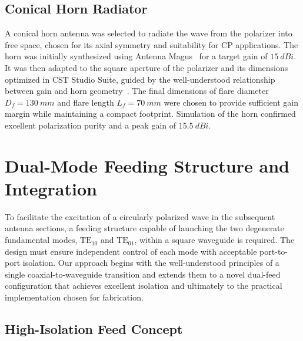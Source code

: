 \documentclass[journal]{IEEEtran}
\newcommand{\TE}[2]{\text{TE}_{#1#2}}
\begin{document}
\subsection{Conical Horn Radiator}
\label{subsec:conical-horn-radiator}

A conical horn antenna was selected to radiate the wave from the polarizer into free space, chosen for its axial symmetry and suitability for CP applications. The horn was initially synthesized using Antenna Magus~\cite{antenna-magus} for a target gain of $\qty{15}{dBi}$. It was then adapted to the square aperture of the polarizer and its dimensions optimized in CST Studio Suite, guided by the well-understood relationship between gain and horn geometry~\cite{aboserwal-et-al:conical-horn-gain-and-amplitude-patterns}. The final dimensions of flare diameter $D_f = \qty{130}{mm}$ and flare length $L_f = \qty{70}{mm}$ were chosen to provide sufficient gain margin while maintaining a compact footprint. Simulation of the horn confirmed excellent polarization purity and a peak gain of $\qty{15.5}{dBi}$.


\section{Dual-Mode Feeding Structure and Integration}
\label{sec:dual-mode-feeding-structure-and-integration}

To facilitate the excitation of a circularly polarized wave in the subsequent antenna sections, a feeding structure capable of launching the two degenerate fundamental modes, $\TE 10$ and $\TE 01$, within a square waveguide is required. The design must ensure independent control of each mode with acceptable port-to-port isolation. Our approach begins with the well-understood principles of a single coaxial-to-waveguide transition and extends them to a novel dual-feed configuration that achieves excellent isolation and ultimately to the practical implementation chosen for fabrication.

\subsection{High-Isolation Feed Concept}
\end{document}
